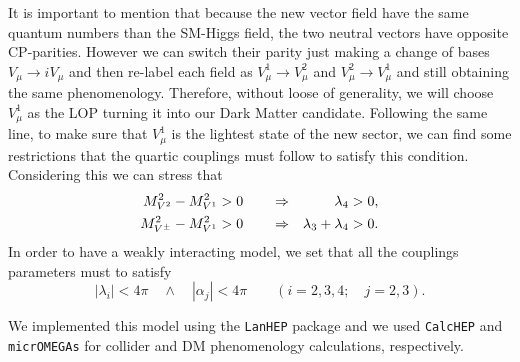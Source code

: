 It is important to mention that because the new vector field have the same quantum numbers than the SM-Higgs field, the two neutral vectors have opposite CP-parities. However we can switch their parity just making a change of bases $V_{\mu}\rightarrow iV_{\mu}$ and then re-label each field as $V^1_{\mu} \rightarrow V^2_{\mu}$ and $V^2_{\mu} \rightarrow V^1_{\mu}$ and still obtaining the same phenomenology. Therefore, without loose of generality, we will choose $V^1_{\mu}$ as the LOP turning it into our Dark Matter candidate. Following the same line, to make sure that $V^1_{\mu}$ is the lightest state of the new sector, we can find some restrictions that the quartic couplings must follow to satisfy this condition. Considering this we can stress that
\begin{eqnarray}
\nonumber \Mv[2]^2 - \Mv[1]^2 > 0  \qquad & \Rightarrow &\ld[4] > 0, \\
\Mvc^2 - \Mv[1]^2 > 0 \qquad & \Rightarrow &\ld[3] + \ld[4] > 0 .
\end{eqnarray}
In order to have a weakly interacting model, we set that all the couplings parameters must to satisfy
\begin{equation}
|\lambda_i| < 4 \pi  \quad \wedge \quad |\alpha_j| < 4 \pi \qquad (i=2,3,4;\quad j=2,3). \label{pert}
\end{equation} 

We implemented this model using the \texttt{LanHEP}\cite{Semenov:2010qt} package  and we used \texttt{CalcHEP}\cite{Belyaev:2012qa} and \texttt{micrOMEGAs}\cite{Belanger:2013oya, Belanger:2006is, Belanger:2010gh} for collider and DM phenomenology calculations, respectively. 


